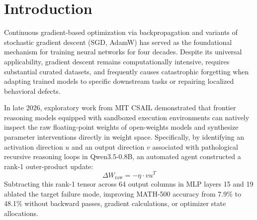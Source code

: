 \documentclass[11pt,a4paper]{article}
\begin{document}
\section{Introduction}

Continuous gradient-based optimization via backpropagation and variants of stochastic gradient descent (SGD, AdamW) has served as the foundational mechanism for training neural networks for four decades. Despite its universal applicability, gradient descent remains computationally intensive, requires substantial curated datasets, and frequently causes catastrophic forgetting when adapting trained models to specific downstream tasks or repairing localized behavioral defects.

In late 2026, exploratory work from MIT CSAIL \cite{takehi2026sparks} demonstrated that frontier reasoning models equipped with sandboxed execution environments can natively inspect the raw floating-point weights of open-weights models and synthesize parameter interventions directly in weight space. Specifically, by identifying an activation direction $u$ and an output direction $v$ associated with pathological recursive reasoning loops in Qwen3.5-0.8B, an automated agent constructed a rank-1 outer-product update:
\begin{equation}
\Delta W_{\text{raw}} = -\eta \cdot v u^T
\end{equation}
Subtracting this rank-1 tensor across 64 output columns in MLP layers 15 and 19 ablated the target failure mode, improving MATH-500 accuracy from 7.9\% to 48.1\% without backward passes, gradient calculations, or optimizer state allocations.
\end{document}
